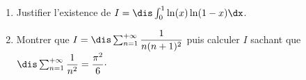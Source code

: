 \documentclass[a4paper,10pt]{report}
\begin{document}
%

\begin{Exa}
\begin{enumerate}
\item Justifier l'existence de $I= \dis \int_{0}^1 \ln(x) \ln(1-x) \dx$.
\item Montrer que $I =\dis \sum_{n=1}^{+ \infty} \dfrac{1}{n(n+1)^2}$ puis calculer $I$ sachant que $\dis \sum_{n=1}^{+ \infty} \dfrac{1}{n^2} = \dfrac{\pi^2}{6}\cdot$
\end{enumerate}
\end{Exa}
\end{document}

